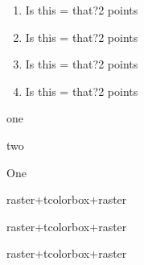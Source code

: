 \documentclass{exam}
\begin{document}
	
	\begin{enumerate}
		\item Is this = that?\hfill 2 points
		\begin{tcolorbox}
		\end{tcolorbox}
		\item Is this = that?\hfill 2 points
		\begin{tcolorbox}
		\end{tcolorbox}
		\item Is this = that?\hfill 2 points
		\begin{tcolorbox}
		\end{tcolorbox}
		\item Is this = that?\hfill 2 points
		\begin{tcolorbox}
				\fillwithlines{\tcbtextheight}
		\end{tcolorbox}
	\end{enumerate}

	
	\newpage

\begin{minipage}[s]{\linewidth}
	one
	\vfill
	\end{minipage}
\begin{minipage}[s]{\linewidth}
	two
		\vfill
\end{minipage}


\newpage
	
	
\begin{tcbraster}[raster equal height=rows,
	raster every box/.style={colframe=red!50!black,colback=red!10!white},
	height=6in
]
	\begin{tcolorbox}[blankest,height fill,raster columns=1]
		\begin{tcbraster}[raster columns=1,height=5in,raster equal height=rows]
			\begin{tcolorbox}[height fill=maximum]One\end{tcolorbox}
				\begin{tcolorbox}[height fill=maximum]raster+tcolorbox+raster\end{tcolorbox}
					\begin{tcolorbox}[height fill=maximum]raster+tcolorbox+raster\end{tcolorbox}
		\end{tcbraster}
	\end{tcolorbox}
	\begin{tcolorbox}raster+tcolorbox+raster\end{tcolorbox}
\end{tcbraster}
\end{document}
